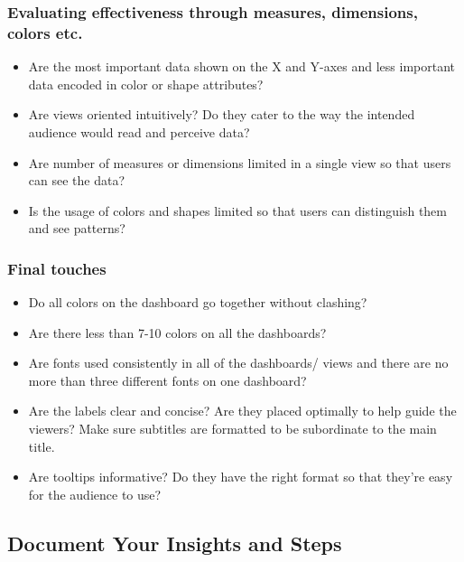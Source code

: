 \documentclass[]{book}
\providecommand{\tightlist}{%
  \setlength{\itemsep}{0pt}\setlength{\parskip}{0pt}}
\begin{document}
\hypertarget{evaluating-effectiveness-through-measures-dimensions-colors-etc.}{%
\subsubsection{Evaluating effectiveness through measures, dimensions, colors etc.}\label{evaluating-effectiveness-through-measures-dimensions-colors-etc.}}

\begin{itemize}
\tightlist
\item
  Are the most important data shown on the X and Y-axes and less important data encoded in color or shape attributes?
\item
  Are views oriented intuitively? Do they cater to the way the intended audience would read and perceive data?
\item
  Are number of measures or dimensions limited in a single view so that users can see the data?
\item
  Is the usage of colors and shapes limited so that users can distinguish them and see patterns?
\end{itemize}

\hypertarget{final-touches}{%
\subsubsection{Final touches}\label{final-touches}}

\begin{itemize}
\tightlist
\item
  Do all colors on the dashboard go together without clashing?
\item
  Are there less than 7-10 colors on all the dashboards?
\item
  Are fonts used consistently in all of the dashboards/ views and there are no more than three different fonts on one dashboard?
\item
  Are the labels clear and concise? Are they placed optimally to help guide the viewers? Make sure subtitles are formatted to be subordinate to the main title.
\item
  Are tooltips informative? Do they have the right format so that they're easy for the audience to use?
\end{itemize}

\hypertarget{document-your-insights-and-steps}{%
\subsection{Document Your Insights and Steps}\label{document-your-insights-and-steps}}
\end{document}
